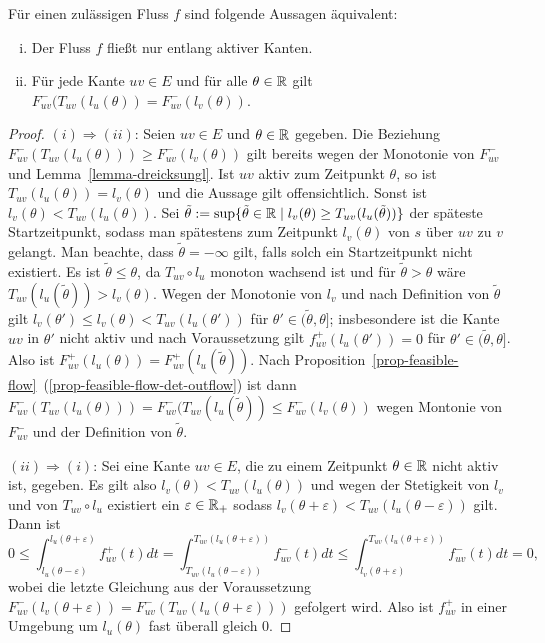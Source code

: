 \begin{lemma}\label{lemma-only-active-edges}
	Für einen zulässigen Fluss $f$ sind folgende Aussagen äquivalent:
	\begin{enumerate}[(i)]
		\item Der Fluss $f$ fließt nur entlang aktiver Kanten.
		\item Für jede Kante $uv\in E$ und für alle $\theta\in\mathbb{R}$ gilt $F_{uv}^-(T_{uv}(l_u(\theta)) = F_{uv}^-(l_v(\theta))$.
	\end{enumerate}
\end{lemma}
\begin{proof}
	$(i)\Rightarrow (ii)$: Seien $uv\in E$ und $\theta\in\mathbb{R}$ gegeben.
	Die Beziehung $F_{uv}^-(T_{uv}(l_u(\theta))) \geq F_{uv}^-(l_v(\theta))$ gilt bereits wegen der Monotonie von $F_{uv}^-$ und Lemma~\ref{lemma-dreicksungl}.
	Ist $uv$ aktiv zum Zeitpunkt $\theta$, so ist $T_{uv}(l_u(\theta))=l_v(\theta)$ und die Aussage gilt offensichtlich.
	Sonst ist $l_v(\theta) < T_{uv}(l_u(\theta))$. 
	Sei $\tilde{\theta}:=\sup\{ \tilde{\theta}\in\mathbb{R} \mid l_v(\theta) \geq T_{uv}(l_u(\tilde{\theta})) \}$ der späteste Startzeitpunkt, sodass man spätestens zum Zeitpunkt $l_v(\theta)$ von $s$ über $uv$ zu $v$ gelangt.
	Man beachte, dass $\tilde{\theta}=-\infty$ gilt, falls solch ein Startzeitpunkt nicht existiert.
	Es ist $\tilde{\theta} \leq \theta$, da $T_{uv}\circ l_u$ monoton wachsend ist und für $\tilde{\theta} > \theta$ wäre $T_{uv}(l_u(\tilde{\theta})) > l_v(\theta)$.
	Wegen der Monotonie von $l_v$ und nach Definition von $\tilde{\theta}$ gilt $l_v(\theta')\leq l_v(\theta)< T_{uv}(l_u(\theta'))$ für $\theta'\in (\tilde{\theta}, \theta]$; insbesondere ist die Kante $uv$ in $\theta'$ nicht aktiv und nach Voraussetzung gilt $f_{uv}^+(l_u(\theta')) = 0$ für $\theta'\in (\tilde{\theta}, \theta]$. 
	Also ist $F_{uv}^+(l_u(\theta)) = F_{uv}^+(l_u(\tilde{\theta}))$. Nach Proposition~\ref{prop-feasible-flow}~(\ref{prop-feasible-flow-det-outflow}) ist dann $F_{uv}^-(T_{uv}(l_u(\theta))) = F_{uv}^-(T_{uv}(l_u(\tilde{\theta}))\leq F_{uv}^-(l_v(\theta))$ wegen Montonie von $F_{uv}^-$ und der Definition von $\tilde{\theta}$.
	
	$(ii) \Rightarrow (i)$: Sei eine Kante $uv\in E$, die zu einem Zeitpunkt $\theta\in\mathbb{R}$ nicht aktiv ist, gegeben.
	Es gilt also $l_v(\theta) < T_{uv}(l_u(\theta))$ und wegen der Stetigkeit von $l_v$ und von $T_{uv}\circ l_u$ existiert ein $\varepsilon\in\mathbb{R}_+$ sodass $l_v(\theta + \varepsilon) < T_{uv}(l_u(\theta - \varepsilon))$ gilt.
	Dann ist 
	$$
	0
	\leq
	\int_{l_u(\theta-\varepsilon)}^{l_u(\theta + \varepsilon)}f_{uv}^+(t) dt
	=
	\int_{T_{uv}(l_u(\theta-\varepsilon))}^{T_{uv}(l_u(\theta+\varepsilon))} f_{uv}^-(t) dt
	\leq
	\int_{l_v(\theta + \varepsilon)}^{T_{uv}(l_u(\theta + \varepsilon))} f_{uv}^-(t) dt
	=
	0,
	$$
	wobei die letzte Gleichung aus der Voraussetzung $F_{uv}^-(l_v(\theta+\varepsilon)) = F_{uv}^-(T_{uv}(l_u(\theta + \varepsilon)))$ gefolgert wird.
	Also ist $f_{uv}^+$ in einer Umgebung um $l_u(\theta)$ fast überall gleich $0$.
	

\end{proof}
